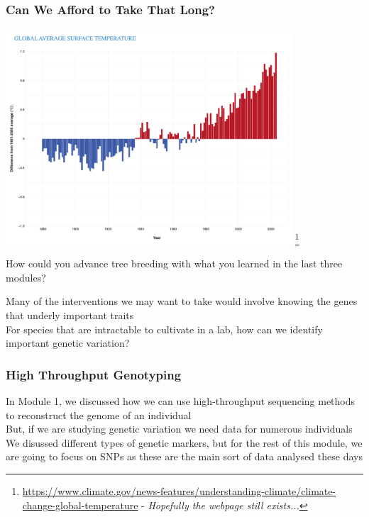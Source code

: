 \documentclass[xcolor=dvipsnames]{beamer}
\newcommand\blfootnote[1]{%
	\begingroup
	\renewcommand\thefootnote{}\footnote{#1}%
	\addtocounter{footnote}{-1}%
	\endgroup
}
\begin{document}
\begin{frame}
\frametitle{Can We Afford to Take That Long?}
\centering
	\includegraphics[keepaspectratio, width  = 0.8\textwidth]{img/graph_globalavgsurfacetemp}
	\blfootnote{\url{https://www.climate.gov/news-features/understanding-climate/climate-change-global-temperature} - \textit{Hopefully the webpage still exists...}}
\end{frame}




\begin{frame}
	\Huge How could you advance tree breeding with what you learned in the last three modules?
\end{frame}

\begin{frame}
\Large
	Many of the interventions we may want to take would involve knowing the genes that underly important traits \\
	
	\vspace{20pt}
	For species that are intractable to cultivate in a lab, how can we identify important genetic variation?
\end{frame}



\begin{frame}
       \frametitle{High Throughput Genotyping}
       
       In Module 1, we discussed how we can use high-throughput sequencing methods to reconstruct the genome of an individual\\
               \vspace{5pt}
       But, if we are studying genetic variation we need data for numerous individuals\\
               \vspace{5pt}
       We disussed different types of genetic markers, but for the rest of this module, we are going to focus on SNPs as these are the main sort of data 
	analysed these days
       
       
       
\end{frame}
\end{document}
